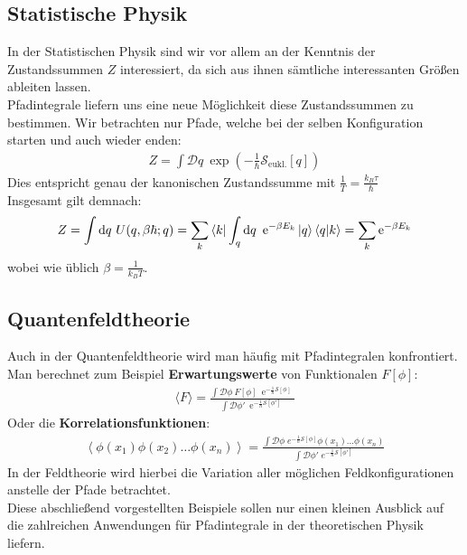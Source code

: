 \subsection{Statistische Physik}
In der Statistischen Physik sind wir vor allem an der Kenntnis der Zustandssummen $Z$ interessiert, da sich aus ihnen sämtliche interessanten Größen ableiten lassen. \\
Pfadintegrale liefern uns  eine neue Möglichkeit diese Zustandssummen zu bestimmen. 
Wir betrachten nur Pfade, welche bei der selben Konfiguration starten und auch wieder enden:
\begin{align}
		Z = \int \mathcal{D}q \ \exp\left(-\frac{1}{\hbar}\mathcal{S}_{\text{eukl.}}[q]\right)
\end{align}
Dies entspricht genau der kanonischen Zustandssumme mit $\frac{1}{T} = \frac{k_B\tau}{\hbar}$ \\
Insgesamt gilt demnach:
\begin{align}
		Z = \int \dd q \ U(q,\beta\hbar;q) = \sum_k\bra{k} \int_q \dd q \ \operatorname{e}^{-\beta E_k}\ket{q}\braket{q}{k} = \sum_k \operatorname{e}^{-\beta E_k}
\end{align}
wobei wie üblich $\beta = \frac{1}{k_B T}$.
\subsection{Quantenfeldtheorie}
Auch in der Quantenfeldtheorie wird man häufig mit Pfadintegralen konfrontiert. Man berechnet zum Beispiel \textbf{Erwartungswerte} von Funktionalen $F[\phi]$:
\begin{align}
	\langle F \rangle = \frac{\int\mathcal{D}\phi \ F[\phi]\ \operatorname{e}^{-\frac{1}{\hbar}\mathcal{S}[\phi]}}{\int\mathcal{D}\phi' \ \operatorname{e}^{-\frac{1}{\hbar}\mathcal{S}[\phi']}}
\end{align}
Oder die \textbf{Korrelationsfunktionen}:
\begin{align}
\left\langle \phi(x_1) \phi(x_2) \ldots \phi(x_n)\right\rangle
=\frac{\int \mathcal D \phi \; e^{-\frac{1}{\hbar}\mathcal{S}[\phi]}\phi(x_1)\ldots \phi(x_n)}{\int \mathcal D \phi' \; e^{-\frac{1}{\hbar}\mathcal{S}[\phi']}}
\end{align}
In der Feldtheorie  wird hierbei die Variation aller möglichen Feldkonfigurationen anstelle der Pfade betrachtet. \\

Diese abschließend vorgestellten Beispiele sollen nur einen kleinen Ausblick auf die zahlreichen Anwendungen für Pfadintegrale in der theoretischen Physik liefern. 